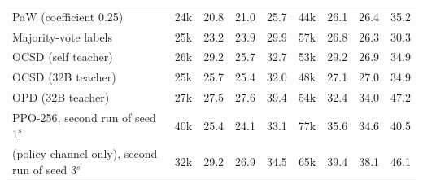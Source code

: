 \begin{tabular}{l r c c c r c c c }
PaW (coefficient 0.25) & 24k & 20.8\sigup{} & 21.0\sigup{} & 25.7 & 44k & 26.1\sigup{} & 26.4\sigup{} & 35.2 \\
Majority-vote labels & 25k & 23.2\sigup{} & 23.9\sigup{} & 29.9 & 57k & 26.8\sigup{} & 26.3\sigup{} & 30.3 \\
OCSD (self teacher) & 26k & 29.2 & 25.7 & 32.7 & 53k & 29.2\sigup{} & 26.9\sigup{} & 34.9 \\
OCSD (32B teacher) & 25k & 25.7 & 25.4\sigup{} & 32.0 & 48k & 27.1\sigup{} & 27.0\sigup{} & 34.9 \\
OPD (32B teacher) & 27k & 27.5 & 27.6 & 39.4 & 54k & 32.4\sigup{} & 34.0\sigup{} & 47.2 \\
PPO-256, second run of seed 1$^{s}$ & 40k & 25.4 & 24.1 & 33.1 & 77k & 35.6 & 34.6 & 40.5 \\
\wmppo{} (policy channel only), second run of seed 3$^{s}$ & 32k & 29.2 & 26.9 & 34.5 & 65k & 39.4 & 38.1 & 46.1 \\
\bottomrule
\end{tabular}
